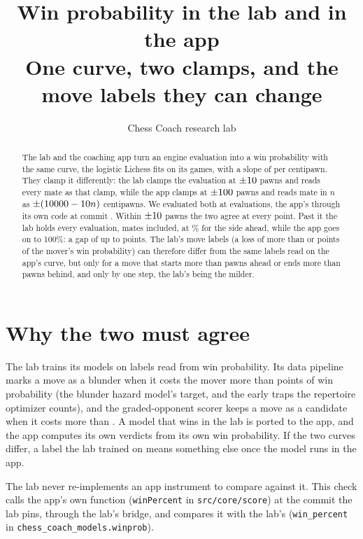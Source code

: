 \documentclass[11pt]{article}
\title{Win probability in the lab and in the app\\[0.3em]
\large One curve, two clamps, and the move labels they can change}
\author{Chess Coach research lab}
\date{}
\begin{document}
\maketitle

\begin{abstract}
The lab and the coaching app turn an engine evaluation into a win probability with the same
curve, the logistic Lichess fits on its games, with a slope of \Slope{} per centipawn. They
clamp it differently: the lab clamps the evaluation at $\pm10$ pawns and reads
every mate as that clamp, while the app clamps at $\pm100$ pawns and reads mate in
$n$ as $\pm(10000 - 10 n)$ centipawns. We evaluated both at \AllPoints{} evaluations, the app's
through its own code at commit \AppCommit. Within $\pm10$ pawns the two agree at
every point. Past it the lab holds every evaluation, mates included, at \LabCeiling\% for the
side ahead, while the app goes on to 100\%: a gap of up to \MaxGap{} points. The lab's move
labels (a loss of more than \CandidateThreshold{} or \BlunderThreshold{} points of the mover's
win probability) can therefore differ from the same labels read on the app's curve, but only
for a move that starts more than \LabClampPawns{} pawns ahead or ends more than
\LabClampPawns{} pawns behind, and only by one step, the lab's being the milder.
\end{abstract}

\section{Why the two must agree}

The lab trains its models on labels read from win probability. Its data pipeline marks a move
as a blunder when it costs the mover more than \BlunderThreshold{} points of win probability
(the blunder hazard model's target, and the early traps the repertoire optimizer counts), and
the graded-opponent scorer keeps a move as a candidate when it costs more than
\CandidateThreshold. A model that wins in the lab is ported to the app, and the app computes its
own verdicts from its own win probability. If the two curves differ, a label the lab trained on
means something else once the model runs in the app.

The lab never re-implements an app instrument to compare against it. This check calls the
app's own function (\texttt{winPercent} in \texttt{src/core/score}) at the commit the lab pins,
through the lab's bridge, and compares it with the lab's (\texttt{win\_percent} in
\texttt{chess\_coach\_models.winprob}).
\end{document}
